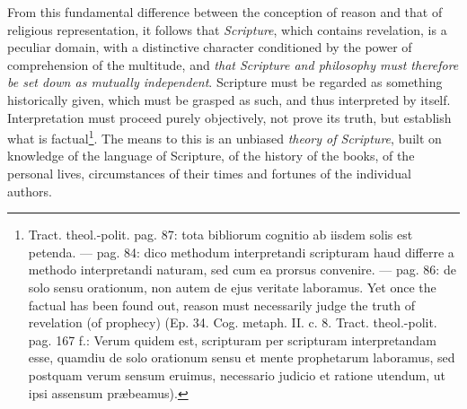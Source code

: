 \documentclass[12pt,a4paper,openany]{book}
\newcommand{\opage}[1]{\marginnote{\footnotesize\textit{[#1]}}}
\begin{document}
From this fundamental difference between the conception of reason and that of religious representation, it follows that \emph{Scripture}, which contains revelation, is a peculiar domain, with a distinctive character conditioned by the power of comprehension of the multitude, and \emph{that Scripture and philosophy must therefore be set down as mutually independent}. Scripture must be regarded as something historically given, which must be grasped as such, and thus interpreted by itself. Interpretation must proceed purely objectively, not prove its truth, but establish what is factual\footnote{Tract. theol.-polit. pag. 87: tota bibliorum cognitio ab iisdem solis est petenda. --- pag. 84: dico methodum interpretandi scripturam haud differre a methodo interpretandi naturam, sed cum ea prorsus convenire. --- pag. 86: de solo sensu orationum, non autem de ejus veritate laboramus. Yet once the factual has been found out, reason must necessarily judge the truth of revelation (of prophecy) (Ep. 34. Cog. metaph. II. c. 8. Tract. theol.-polit. pag. 167 f.: Verum quidem est, scripturam per scripturam interpretandam esse, quamdiu de solo orationum sensu et mente prophetarum laboramus, sed postquam verum sensum eruimus, necessario judicio et ratione utendum, ut ipsi assensum præbeamus).}. The means to this is an unbiased \emph{theory of Scripture},
\opage{155}\setcounter{footnote}{0}built on knowledge of the language of Scripture, of the history of the books, of the personal lives, circumstances of their times and fortunes of the individual authors.
\end{document}
